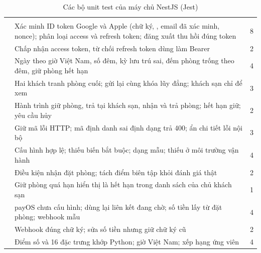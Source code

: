 \begin{rtable}
\begin{longtable}{|L{5.4cm}|L{7.9cm}|C{1.4cm}|}
\caption{Các bộ unit test của máy chủ NestJS (Jest)}\label{tab:unit-jest}\\
\hline
{} &  &  \\ \hline
\endfirsthead
\hline
{} &  &  \\ \hline
\endhead
{} & Xác minh ID token Google và Apple (chữ ký, , email đã xác minh, nonce); phân loại access và refresh token; đăng xuất thu hồi đúng token & 8 \\ \hline
{} & Chấp nhận access token, từ chối refresh token dùng làm Bearer & 2 \\ \hline
{} & Ngày theo giờ Việt Nam, số đêm, kỳ lưu trú sai, đếm phòng trống theo đêm, giữ phòng hết hạn & 4 \\ \hline
{} & Hai khách tranh phòng cuối; gửi lại cùng khóa lũy đẳng; khách sạn chỉ để xem & 3 \\ \hline
{} & Hành trình giữ phòng, trả tại khách sạn, nhận và trả phòng; hết hạn giữ; yêu cầu hủy & 2 \\ \hline
{} & Giữ mã lỗi HTTP; mã định danh sai định dạng trả 400; ẩn chi tiết lỗi nội bộ & 3 \\ \hline
{} & Cấu hình hợp lệ; thiếu biến bắt buộc;  dạng mẫu; thiếu  ở môi trường vận hành & 4 \\ \hline
{} & Điều kiện nhận đặt phòng; tách điểm biên tập khỏi đánh giá thật & 2 \\ \hline
{} & Giữ phòng quá hạn hiển thị là hết hạn trong danh sách của chủ khách sạn & 1 \\ \hline
{} & payOS chưa cấu hình; dùng lại liên kết đang chờ; số tiền lấy từ đặt phòng; webhook mẫu & 4 \\ \hline
{} & Webhook đúng chữ ký; sửa số tiền nhưng giữ chữ ký cũ & 2 \\ \hline
{} & Điểm số và 16 đặc trưng khớp Python; giờ Việt Nam; xếp hạng ứng viên & 4 \\ \hline

\end{longtable}
\end{rtable}
